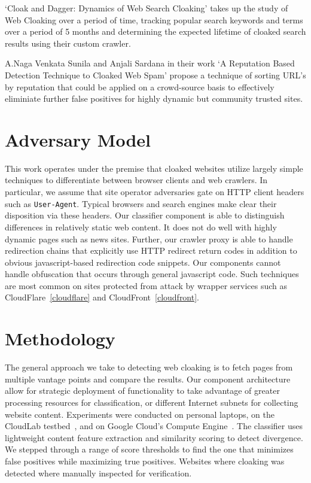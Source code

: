 \documentclass[letterpaper,twocolumn,10pt]{article}
\begin{document}
`Cloak and Dagger: Dynamics of Web Search Cloaking'\cite{Wang:2011:CDD:2046707.2046763} takes up the study of Web Cloaking over a period of time, tracking popular search keywords and terms over a period of 5 months and determining the expected lifetime of cloaked search results using their custom crawler.

A.Naga Venkata Sunila and Anjali Sardana in their work `A Reputation Based Detection Technique to Cloaked Web Spam'\cite{sunil2012reputation} propose a technique of sorting URL's by reputation that could be applied on a crowd-source basis to effectively eliminiate further false positives for highly dynamic but community trusted sites.
\section{Adversary Model}

This work operates under the premise that cloaked websites utilize largely simple techniques to differentiate between browser clients and web crawlers. In particular, we assume that site operator adversaries gate on HTTP client headers such as \texttt{User-Agent}.  Typical browsers and search engines make clear their disposition via these headers.  Our classifier component is able to distinguish differences in relatively static web content.  It does not do well with highly dynamic pages such as news sites.  Further, our crawler proxy is able to handle redirection chains that explicitly use HTTP redirect return codes in addition to obvious javascript-based redirection code snippets.  Our components cannot handle obfuscation that occurs through general javascript code.  Such techniques are most common on sites protected from attack by wrapper services such as CloudFlare~\ref{cloudflare} and CloudFront~\ref{cloudfront}.

\section{Methodology}

The general approach we take to detecting web cloaking is to fetch pages from multiple vantage points and compare the results.  Our component architecture allow for strategic deployment of functionality to take advantage of greater processing resources for classification, or different Internet subnets for collecting website content. Experiments were conducted on personal laptops, on the CloudLab testbed~\cite{cloudlab}, and on Google Cloud's Compute Engine~\cite{gcloud}. The classifier uses lightweight content feature extraction and similarity scoring to detect divergence.  We stepped through a range of score thresholds to find the one that minimizes false positives while maximizing true positives.  Websites where cloaking was detected where manually inspected for verification.
\end{document}

